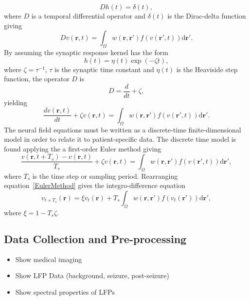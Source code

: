 \documentclass[]{article}
\begin{document}
\begin{equation}
	\label{GreensFuncDef} Dh\left( t \right) = \delta \left( t \right), 
\end{equation}
where $D$ is a temporal differential operator and $\delta(t)$ is the Dirac-delta function giving 
\begin{equation}
	\label{FinalFormContinuous} 
	Dv\left( \mathbf{r},t \right) = \int_\Omega {w\left( \mathbf{r},\mathbf{r}' \right)f\left( {v\left( \mathbf{r}',t \right)} \right)\textrm{d}\mathbf{r}'}. 
\end{equation}
By assuming the synaptic response kernel has the form 
\begin{equation}
	\label{SynapticRespKernel} h(t) = \eta(t)\exp{\left(-\zeta t\right)}, 
\end{equation}
where $\zeta=\tau^{-1}$, $\tau$ is the synaptic time constant and $\eta(t)$ is the Heaviside step function, the operator $D$ is
\begin{equation}
	D=\frac{d}{dt} + \zeta,
\end{equation}
yielding
\begin{equation}
	\label{FinalFormContinuous} 
	\frac{dv\left( \mathbf{r},t \right)}{dt} + \zeta v\left( \mathbf{r},t \right) = \int_\Omega {w\left( \mathbf{r},\mathbf{r}' \right)f\left( {v\left( \mathbf{r}',t \right)} \right)\textrm{d}\mathbf{r}'}. 
\end{equation}
The neural field equations must be written as a discrete-time finite-dimensional model in order to relate it to patient-specific data. The discrete time model is found applying the a first-order Euler method giving
\begin{equation}\label{EulerMethod}
	\frac{v\left( \mathbf{r},t+T_s \right)-v\left( \mathbf{r},t \right)}{T_s} + \zeta v\left(\mathbf{r},t \right) = \int_\Omega {w\left( \mathbf{r},\mathbf{r}' \right) f\left( {v\left( \mathbf{r}',t \right)}\right)\textrm{d}\mathbf{r}'},
\end{equation}
where $T_s$ is the time step or sampling period. Rearranging equation~\ref{EulerMethod} gives the integro-difference equation
\begin{equation}
	\label{DiscreteTimeModel} 
	v_{t+T_s}\left(\mathbf{r}\right) = 
	\xi v_t\left(\mathbf{r}\right) + 
	T_s \int_\Omega { 
	    w\left(\mathbf{r},\mathbf{r}'\right)
	    f\left(v_t\left(\mathbf{r}'\right)\right) 
	\textrm{d}\mathbf{r}'}, 
\end{equation}
where $\xi = 1-T_s\zeta$. 


\subsection{Data Collection and Pre-processing}
\begin{itemize}
	\item Show medical imaging
	\item Show LFP Data (background, seizure, post-seizure)
	\item Show spectral properties of LFPs
\end{itemize}
\end{document}
